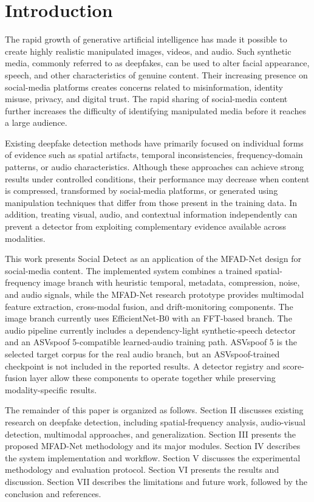 \documentclass[conference]{IEEEtran}
\begin{document}
\section{Introduction}

The rapid growth of generative artificial intelligence has made it possible to create highly realistic manipulated images, videos, and audio. Such synthetic media, commonly referred to as deepfakes, can be used to alter facial appearance, speech, and other characteristics of genuine content. Their increasing presence on social-media platforms creates concerns related to misinformation, identity misuse, privacy, and digital trust. The rapid sharing of social-media content further increases the difficulty of identifying manipulated media before it reaches a large audience.

Existing deepfake detection methods have primarily focused on individual forms of evidence such as spatial artifacts, temporal inconsistencies, frequency-domain patterns, or audio characteristics. Although these approaches can achieve strong results under controlled conditions, their performance may decrease when content is compressed, transformed by social-media platforms, or generated using manipulation techniques that differ from those present in the training data. In addition, treating visual, audio, and contextual information independently can prevent a detector from exploiting complementary evidence available across modalities.

This work presents Social Detect as an application of the MFAD-Net design for social-media content. The implemented system combines a trained spatial-frequency image branch with heuristic temporal, metadata, compression, noise, and audio signals, while the MFAD-Net research prototype provides multimodal feature extraction, cross-modal fusion, and drift-monitoring components. The image branch currently uses EfficientNet-B0 with an FFT-based branch. The audio pipeline currently includes a dependency-light synthetic-speech detector and an ASVspoof 5-compatible learned-audio training path. ASVspoof 5 is the selected target corpus for the real audio branch, but an ASVspoof-trained checkpoint is not included in the reported results. A detector registry and score-fusion layer allow these components to operate together while preserving modality-specific results.

The remainder of this paper is organized as follows. Section II discusses existing research on deepfake detection, including spatial-frequency analysis, audio-visual detection, multimodal approaches, and generalization. Section III presents the proposed MFAD-Net methodology and its major modules. Section IV describes the system implementation and workflow. Section V discusses the experimental methodology and evaluation protocol. Section VI presents the results and discussion. Section VII describes the limitations and future work, followed by the conclusion and references.
\end{document}
